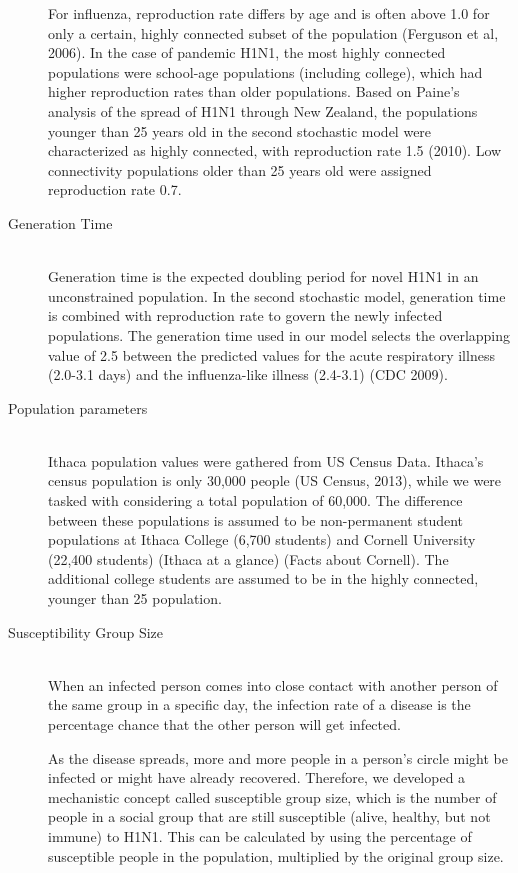 \documentclass[titlepage]{article}
\begin{document}
\begin{description}
For influenza, reproduction rate differs by age and is often above 1.0 for only a certain, highly connected subset of the population (Ferguson et al, 2006). In the case of pandemic H1N1, the most highly connected populations were school-age populations (including college), which had higher reproduction rates than older populations. Based on Paine's analysis of the spread of H1N1 through New Zealand, the populations younger than 25 years old in the second stochastic model were characterized as highly connected, with reproduction rate 1.5 (2010). Low connectivity populations older than 25 years old were assigned reproduction rate 0.7.

\item[Generation Time]\hfill \\
Generation time is the expected doubling period for novel H1N1 in an unconstrained population. In the second stochastic model, generation time is combined with reproduction rate to govern the newly infected populations. The generation time used in our model selects the overlapping value of 2.5 between the predicted values for the acute respiratory illness (2.0-3.1 days) and the influenza-like illness (2.4-3.1) (CDC 2009).

\item[Population parameters]\hfill \\
Ithaca population values were gathered from US Census Data. Ithaca's census population is only 30,000 people (US Census, 2013), while we were tasked with considering a total population of 60,000. The difference between these populations is assumed to be non-permanent student populations at Ithaca College (6,700 students) and Cornell University (22,400 students) (Ithaca at a glance) (Facts about Cornell). The additional college students are assumed to be in the highly connected, younger than 25 population.

\item[Susceptibility Group Size]\hfill \\
When an infected person comes into close contact with another person of the same group in a specific day, the infection rate of a disease is the percentage chance that the other person will get infected.

As the disease spreads, more and more people in a person's circle might be infected or might have already recovered. Therefore, we developed a mechanistic concept called susceptible group size, which is the number of people in a social group that are still susceptible (alive, healthy, but not immune) to H1N1. This can be calculated by using the percentage of susceptible people in the population, multiplied by the original group size.


\end{description}
\end{document}
